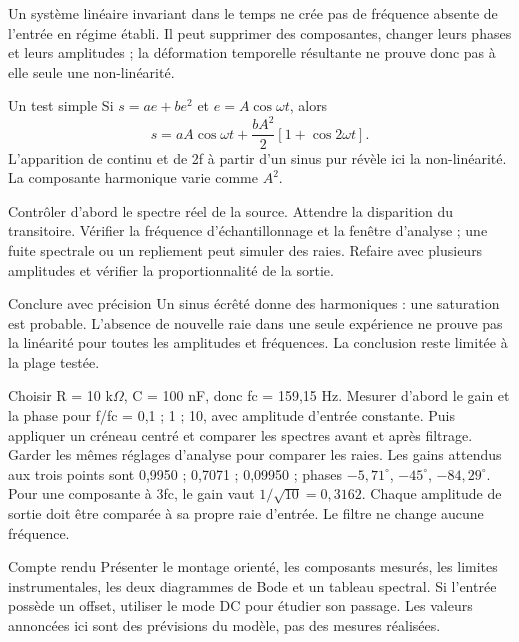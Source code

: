 Un système linéaire invariant dans le temps ne crée pas de fréquence absente de l’entrée en régime établi. Il peut supprimer des composantes, changer leurs phases et leurs amplitudes ; la déformation temporelle résultante ne prouve donc pas à elle seule une non-linéarité.
\begin{loi}{Un test simple}
Si $s=ae+be^2$ et $e=A\cos\omega t$, alors\[s=aA\cos\omega t+\frac{bA^2}{2}[1+\cos2\omega t].\]L’apparition de continu et de 2f à partir d’un sinus pur révèle ici la non-linéarité. La composante harmonique varie comme $A^2$.
\end{loi}
Contrôler d’abord le spectre réel de la source. Attendre la disparition du transitoire. Vérifier la fréquence d’échantillonnage et la fenêtre d’analyse ; une fuite spectrale ou un repliement peut simuler des raies. Refaire avec plusieurs amplitudes et vérifier la proportionnalité de la sortie.
\begin{methode}{Conclure avec précision}
Un sinus écrêté donne des harmoniques : une saturation est probable. L’absence de nouvelle raie dans une seule expérience ne prouve pas la linéarité pour toutes les amplitudes et fréquences. La conclusion reste limitée à la plage testée.
\end{methode}


Choisir R = 10 k$\Omega$, C = 100 nF, donc fc = 159,15 Hz. Mesurer d’abord le gain et la phase pour f/fc = 0,1 ; 1 ; 10, avec amplitude d’entrée constante. Puis appliquer un créneau centré et comparer les spectres avant et après filtrage. Garder les mêmes réglages d’analyse pour comparer les raies.
Les gains attendus aux trois points sont 0,9950 ; 0,7071 ; 0,09950 ; phases $-5{,}71^\circ$, $-45^\circ$, $-84{,}29^\circ$. Pour une composante à 3fc, le gain vaut $1/\sqrt{10}=0{,}3162$. Chaque amplitude de sortie doit être comparée à sa propre raie d’entrée. Le filtre ne change aucune fréquence.
\begin{docu}{Compte rendu}
Présenter le montage orienté, les composants mesurés, les limites instrumentales, les deux diagrammes de Bode et un tableau spectral. Si l’entrée possède un offset, utiliser le mode DC pour étudier son passage. Les valeurs annoncées ici sont des prévisions du modèle, pas des mesures réalisées.
\end{docu}


